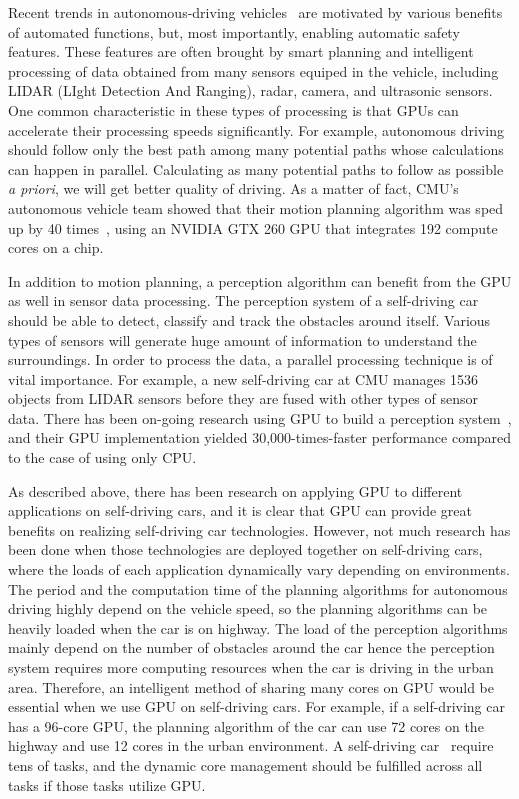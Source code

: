 \documentclass[times, 10pt, twocolumn]{article}
\begin{document}
Recent trends in autonomous-driving vehicles~\cite{Kelly12, Markoff10,
Urmson08} are motivated by various benefits of automated functions,
but, most importantly, enabling automatic safety features. 
These features are often brought by smart planning and intelligent
processing of data obtained from many sensors equiped in the vehicle,
including LIDAR (LIght Detection And Ranging), radar, camera, and
ultrasonic sensors. 
One common characteristic in these types of processing is that GPUs can
accelerate their processing speeds significantly.
For example, autonomous driving should follow only the best path among
many potential paths whose calculations can happen in parallel.
Calculating as many potential paths to follow as possible
{\it a priori}, we will get better quality of driving.
As a matter of fact, CMU's autonomous vehicle team showed that their
motion planning algorithm was sped up by 40 times~\cite{McNaughton11},
using an NVIDIA GTX 260 GPU that integrates 192 compute cores on a
chip.

In addition to motion planning, a perception algorithm can benefit
from the GPU as well in sensor data processing.
The perception system of a self-driving car should
be able to detect, classify and track the obstacles around
itself. Various types of sensors will generate huge amount of
information to understand the surroundings. In order to process the
data, a parallel processing technique is of vital importance. For
example, a new self-driving car at CMU manages 1536 objects from LIDAR
sensors before they are fused with other types of sensor data. There has
been on-going research using GPU to build a perception
system~\cite{Ferreira11}, and their GPU implementation yielded
30,000-times-faster performance compared to the case of using only CPU. 

As described above, there has been research on applying GPU to different applications on self-driving cars, and it is clear that GPU can provide great benefits on realizing self-driving car technologies. However, not much research has been done when those technologies are deployed together on self-driving cars, where the loads of each application dynamically vary depending on environments. The period and the computation time of the planning algorithms for autonomous driving highly depend on the vehicle speed, so the planning algorithms can be heavily loaded when the car is on highway. The load of the perception algorithms mainly depend on the number of obstacles around the car hence the perception system requires more computing resources when the car is driving in the urban area. Therefore, an intelligent method of sharing many cores on GPU would be essential when we use GPU on self-driving cars. For example, if a self-driving car has a 96-core GPU, the planning algorithm of the car can use 72 cores on the highway and use 12 cores in the urban environment. A self-driving car~\cite{Urmson08} require tens of tasks, and the dynamic core management should be fulfilled across all tasks if those tasks utilize GPU. 
\end{document}
